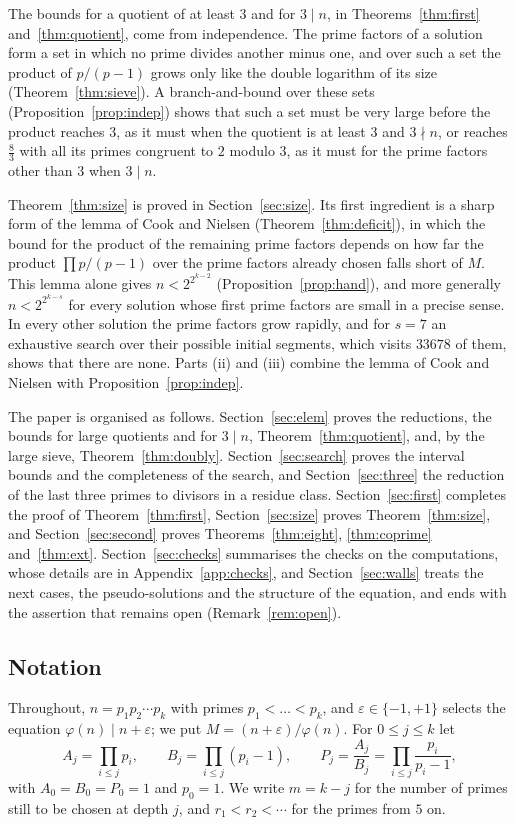 \documentclass[11pt,reqno]{amsart}
\numberwithin{equation}{section}
\theoremstyle{plain}
\theoremstyle{definition}
\theoremstyle{remark}
\begin{document}
The bounds for a quotient of at least $3$ and for $3\mid n$, in
Theorems~\ref{thm:first} and~\ref{thm:quotient}, come from
independence. The prime factors of a solution form a set in which no
prime divides another minus one, and over such a set the product of
$p/(p-1)$ grows only like the double logarithm of its size
(Theorem~\ref{thm:sieve}). A branch-and-bound over these sets
(Proposition~\ref{prop:indep}) shows that such a set must be very large
before the product reaches $3$, as it must when the quotient is at
least $3$ and $3\nmid n$, or reaches $\frac83$ with all its primes
congruent to $2$ modulo $3$, as it must for the prime factors other
than $3$ when $3\mid n$.

Theorem~\ref{thm:size} is proved in Section~\ref{sec:size}. Its first
ingredient is a sharp form of the lemma of Cook and Nielsen
(Theorem~\ref{thm:deficit}), in which the bound for the product of the
remaining prime factors depends on how far the product
$\prod p/(p-1)$ over the prime factors already chosen falls short of
$M$. This lemma alone gives $n<2^{2^{k-2}}$
(Proposition~\ref{prop:hand}), and more generally $n<2^{2^{k-s}}$ for
every solution whose first prime factors are small in a precise sense.
In every other solution the prime factors grow rapidly, and for $s=7$
an exhaustive search over their possible initial segments, which visits
$33678$ of them, shows that there are none. Parts (ii) and (iii)
combine the lemma of Cook and Nielsen with Proposition~\ref{prop:indep}.

The paper is organised as follows. Section~\ref{sec:elem} proves the
reductions, the bounds for large quotients and for $3\mid n$,
Theorem~\ref{thm:quotient}, and, by the large sieve,
Theorem~\ref{thm:doubly}. Section~\ref{sec:search} proves the interval
bounds and the completeness of the search, and
Section~\ref{sec:three} the reduction of the last three primes to
divisors in a residue class. Section~\ref{sec:first} completes the
proof of Theorem~\ref{thm:first}, Section~\ref{sec:size} proves
Theorem~\ref{thm:size}, and Section~\ref{sec:second} proves
Theorems~\ref{thm:eight}, \ref{thm:coprime} and~\ref{thm:ext}.
Section~\ref{sec:checks} summarises the checks on the computations,
whose details are in Appendix~\ref{app:checks}, and
Section~\ref{sec:walls} treats the next cases, the pseudo-solutions
and the structure of the equation, and ends with the assertion that
remains open (Remark~\ref{rem:open}).

\subsection*{Notation}
Throughout, $n=p_1p_2\cdots p_k$ with primes $p_1<\dots<p_k$, and
$\varepsilon\in\{-1,+1\}$ selects the equation
$\varphi(n)\mid n+\varepsilon$; we put $M=(n+\varepsilon)/\varphi(n)$.
For $0\le j\le k$ let
\[
  A_j=\prod_{i\le j}p_i,\qquad B_j=\prod_{i\le j}(p_i-1),\qquad
  P_j=\frac{A_j}{B_j}=\prod_{i\le j}\frac{p_i}{p_i-1},
\]
with $A_0=B_0=P_0=1$ and $p_0=1$. We write $m=k-j$ for the number of
primes still to be chosen at depth $j$, and
$r_1<r_2<\cdots$ for the primes from $5$ on.
\end{document}

